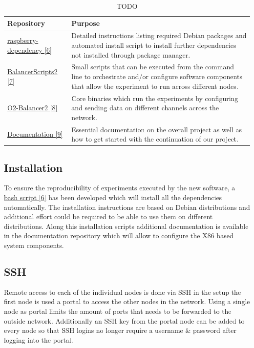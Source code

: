 \documentclass[]{article}
\begin{document}
\begin{table}[H]
	\begin{center}
		\begin{tabularx}{\textwidth}{ | l | X | }
			\hline			
			\textbf{Repository} & \textbf{Purpose} \\ \hline
			
			\hyperref[sec:ref06]{raspberry-dependency [6]} & Detailed instructions listing required Debian packages and automated install script to install further dependencies not installed through package manager. \\ \hline
			\hyperref[sec:ref07]{BalancerScripts2 [7]} & Small scripts that can be executed from the command line to orchestrate and/or configure software components that allow the experiment to run across different nodes. \\ \hline
			\hyperref[sec:ref08]{O2-Balancer2 [8]} & Core binaries which run the experiments by configuring and sending data on different channels across the network. \\ \hline
			\hyperref[sec:ref09]{Documentation [9]} & Essential documentation on the overall project as well as how to get started with the continuation of our project. \\ \hline
		\end{tabularx}
		\caption{TODO}
		\label{tab:librabies}
	\end{center}
\end{table}


\subsection{Installation}
To ensure the reproducibility of experiments executed by the new software, a \hyperref[sec:ref06]{bash script [6]} has been developed which will install all the dependencies automatically. The installation instructions are based on Debian distributions and additional effort could be required to be able to use them on different distributions. Along this installation scripts additional documentation is available in the documentation repository which will allow to configure the X86 based system components.


\subsection{SSH}
Remote access to each of the individual nodes is done via SSH in the setup the first node is used a portal to access the other nodes in the network. Using a single node as portal limits the amount of ports that needs to be forwarded to the outside network. Additionally an SSH key from the portal node can be added to every node so that SSH logins no longer require a username \& password after logging into the portal.
\end{document}
